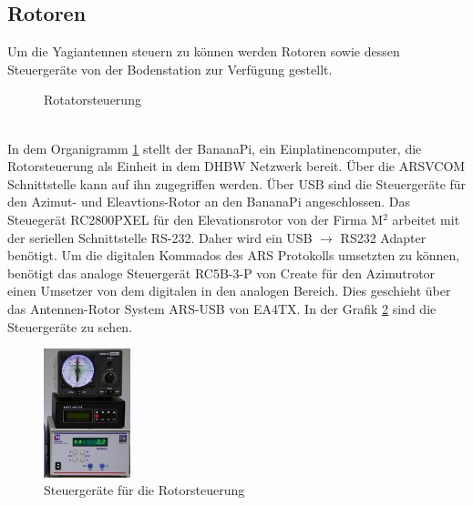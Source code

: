 \subsection{Rotoren}
Um die Yagiantennen steuern zu können werden Rotoren sowie dessen Steuergeräte von der Bodenstation zur Verfügung gestellt.
\begin{figure}[h]
 \centering
 
 \caption{Rotatorsteuerung}
 \label{fig:azel}
\end{figure}\\
In dem Organigramm \ref{fig:azel} stellt der BananaPi, ein Einplatinencomputer, die Rotorsteuerung als Einheit in dem DHBW Netzwerk bereit. Über die 
ARSVCOM Schnittstelle kann auf ihn zugegriffen werden. %
Über USB sind die Steuergeräte für den Azimut- und Eleavtions-Rotor an den BananaPi angeschlossen. Das Steuegerät RC2800PXEL für den Elevationsrotor 
von der Firma M$^2$ arbeitet mit der seriellen Schnittstelle RS-232. Daher wird ein USB $\rightarrow$ RS232 Adapter benötigt. Um die digitalen 
Kommados des ARS Protokolls umsetzten zu können, benötigt das analoge Steuergerät RC5B-3-P von Create für den Azimutrotor einen Umsetzer von dem 
digitalen in den analogen Bereich. Dies geschieht über das Antennen-Rotor System ARS-USB von EA4TX. In der Grafik \ref{fig:rot} sind die Steuergeräte 
zu sehen.
\begin{figure}[h]
 \centering
 \includegraphics[width=0.225\textwidth]{images/sat-rotor-steuerungen}
 \caption{Steuergeräte für die Rotorsteuerung}
 \label{fig:rot}
\end{figure}
\clearpage

